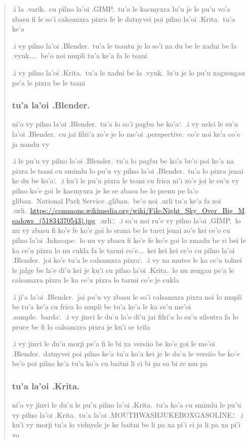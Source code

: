 \documentclass{report}
\newcommand\sds{\spacefactor\sfcode`.\ \space}
\begin{document}
\begin{quote}
	.i la .varik.\ cu pilno la'oi .GIMP.\ tu'a le kacmyxra lu'u je le pu'u vo'a zbasu fi le so'i calsamxra pixra fe le datnyvei poi pilno la'oi .Krita.\ tu'a ke'a

	.i vy pilno la'oi .Blender.\ tu'a le tsautu je lo so'i na du be le xadni be la .vynk....\ be'o noi mupli tu'a ke'a fa le tsani

	.i vy pilno la'oi .Krita.\ tu'a le xadni be la .vynk.\ lu'u je lo pu'u xagzengau pe'a le pixra be le tsani

	\subsubsection{tu'a la'oi .Blender.}
	ni'o vy pilno la'oi .Blender.\ tu'a lo so'i pagbu be ko'a\sds .i vy nelci le su'u la'oi .Blender.\ cu jai filri'a zo'e je lo me'oi .perspective.\ co'e noi ke'a co'e ja nandu vy

	.i le pu'u vy pilno la'oi .Blender.\ tu'a lo pagbu be ko'a be'o poi ke'a na pixra le tsani cu smimlu lo pu'u vy pilno la'oi .Blender.\ tu'a lo pixra jenai ke du be ko'a\sds .i ku'i le pu'u pixra le tsani cu frica ni'i zo'e joi le su'u vy pilno ko'e goi le kacmyxra je ke se zbasu be lo prenu pe la'o glibau.\ National Park Service .glibau.\ be'o noi .urli tu'a ke'a fa zoi .urli.\ \url{https://commons.wikimedia.org/wiki/File:Night_Sky_Over_Big_Meadows_(51834370543).jpg}\ .urli.\sds .i sa'u nai ru'e vy pilno la'oi .GIMP.\ lo nu vy zbasu fi ko'e fe ko'e goi lo srana be le tarci jenai zo'e kei ce'o cu pilno la'oi .Inkscape.\ lo nu vy zbasu fi ko'e fe ko'e goi lo zmadu be ri bei le ka ce'u pixra lo nu cukla fa le tarmi co'e...\ kei kei kei ce'o cu pilno la'oi .Blender.\ joi ko'e tu'a le calsamxra pixra\sds .i vy na mutce le ka ce'u tolnei le jalge be la'e di'u kei je ku'i cu pilno la'oi .Krita.\ lo nu zengau pe'a le calsamxra pixra le ka ce'u pixra lo tarmi co'e je cukla

	.i ji'a la'oi .Blender.\ jai pu'u vy zbasu le so'i calsamxra pixra noi lo mupli be tu'a ke'a cu frica lo mupli be tu'a ke'a le ka ce'u me'oi .sample.\ barda\sds .i vy jinvi le du'u la'e di'u jai filri'a lo su'u zilsutra fa lo pruce be fi lo calsamxra pixra je ku'i se tcila

	.i vy jinvi le du'u morji pe'a fi le bi xa versiio be ko'e goi le me'oi .Blender.\ datnyvei poi pilno ke'a tu'a ko'a kei je le du'u le versiio be ko'e be'o poi pilno ke'a tu'a ko'a cu baitni li ci bi pa so bi re mu pa

	\subsubsection{tu'a la'oi .Krita.}
	ni'o vy jinvi le du'u le pu'u pilno la'oi .Krita.\ tu'a ko'a cu smimlu le pu'u vy pilno la'oi .Krita.\ tu'a la'oi .MOUTHWASHJUKEBOXGASOLINE.\sds .i ku'i vy morji tu'a lo vidnysle je ke baitni be li pa xa pi'i ci ja li pa xa pi'i vo


\end{quote}
\end{document}
